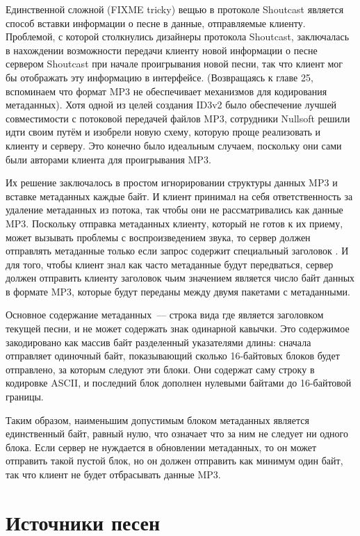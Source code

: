 Единственной сложной (FIXME tricky) вещью в протоколе Shoutcast является способ вставки
информации о песне в данные, отправляемые клиенту.  Проблемой, с которой столкнулись
дизайнеры протокола Shoutcast, заключалась в нахождении возможности передачи клиенту новой
информации о песне сервером Shoutcast при начале проигрывания новой песни, так что клиент
мог бы отображать эту информацию в интерфейсе. (Возвращаясь к главе 25, вспоминаем что
формат MP3 не обеспечивает механизмов для кодирования метаданных).  Хотя одной из целей
создания ID3v2 было обеспечение лучшей совместимости с потоковой передачей файлов MP3,
сотрудники Nullsoft решили идти своим путём и изобрели новую схему, которую проще
реализовать и клиенту и серверу.  Это конечно было идеальным случаем, поскольку они сами
были авторами клиента для проигрывания MP3.

Их решение заключалось в простом игнорировании структуры данных MP3 и вставке метаданных
каждые  байт.  И клиент принимал на себя ответственность за удаление метаданных из
потока, так чтобы они не рассматривались как данные MP3.  Поскольку отправка метаданных
клиенту, который не готов к их приему, может вызывать проблемы с воспроизведением звука,
то сервер должен отправлять метаданные только если запрос содержит специальный заголовок
.  И для того, чтобы клиент знал как часто метаданные будут
передваться, сервер должен отправить клиенту заголовок  чьим значением
является число байт данных в формате MP3, которые будут переданы между двумя пакетами с
метаданными.

Основное содержание метаданных~--- строка вида  где 
является заголовком текущей песни, и не может содержать знак одинарной кавычки.  Это
содержимое закодировано как массив байт разделенный указателями длины: сначала отправляет
одиночный байт, показывающий сколько 16-байтовых блоков будет отправлено, за которым
следуют эти блоки.  Они содержат саму строку в кодировке ASCII, и последний блок дополнен
нулевыми байтами до 16-байтовой границы.

Таким образом, наименьшим допустимым блоком метаданных является единственный байт, равный
нулю, что означает что за ним не следует ни одного блока.  Если сервер не нуждается в
обновлении метаданных, то он может отправить такой пустой блок, но он должен отправить как
минимум один байт, так что клиент не будет отбрасывать данные MP3.

\section{Источники песен}

